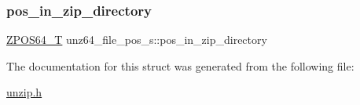 \subsubsection{\texorpdfstring{pos\+\_\+in\+\_\+zip\+\_\+directory}{pos\_in\_zip\_directory}}
{\footnotesize\ttfamily \hyperlink{ioapi_8h_afffed08ed7f2413fa38e12a223ae0e72}{Z\+P\+O\+S64\+\_\+T} unz64\+\_\+file\+\_\+pos\+\_\+s\+::pos\+\_\+in\+\_\+zip\+\_\+directory}



The documentation for this struct was generated from the following file\+:\begin{DoxyCompactItemize}
\item 
\hyperlink{unzip_8h}{unzip.\+h}\end{DoxyCompactItemize}
